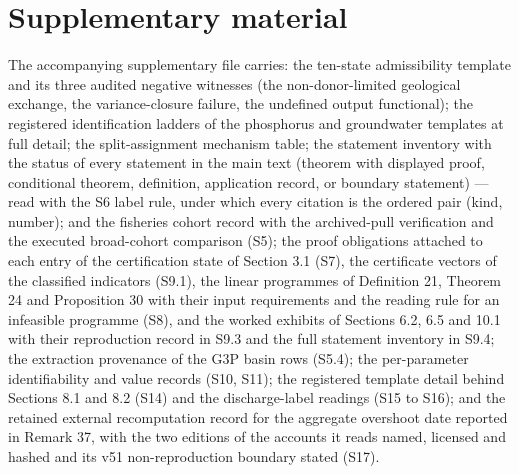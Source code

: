 \documentclass[11pt]{article}
\begin{document}
\vspace{0.8em}

\section*{Supplementary material}\label{supplementary-material}

The accompanying supplementary file carries: the ten-state admissibility template and its three audited negative witnesses (the non-donor-limited geological exchange, the variance-closure failure, the undefined output functional); the registered identification ladders of the phosphorus and groundwater templates at full detail; the split-assignment mechanism table; the statement inventory with the status of every statement in the main text (theorem with displayed proof, conditional theorem, definition, application record, or boundary statement) --- read with the S6 label rule, under which every citation is the ordered pair (kind, number); and the fisheries cohort record with the archived-pull verification and the executed broad-cohort comparison (S5); the proof obligations attached to each entry of the certification state of Section 3.1 (S7), the certificate vectors of the classified indicators (S9.1), the linear programmes of Definition 21, Theorem 24 and Proposition 30 with their input requirements and the reading rule for an infeasible programme (S8), and the worked exhibits of Sections 6.2, 6.5 and 10.1 with their reproduction record in S9.3 and the full statement inventory in S9.4; the extraction provenance of the G3P basin rows (S5.4); the per-parameter identifiability and value records (S10, S11); the registered template detail behind Sections 8.1 and 8.2 (S14) and the discharge-label readings (S15 to S16); and the retained external recomputation record for the aggregate overshoot date reported in Remark 37, with the two editions of the accounts it reads named, licensed and hashed and its v51 non-reproduction boundary stated (S17).
\end{document}
